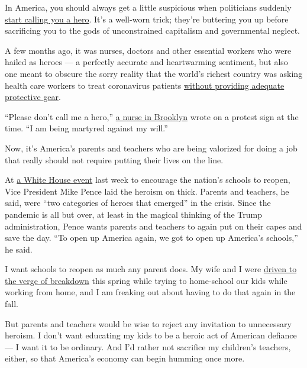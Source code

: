 In America, you should always get a little suspicious when politicians
suddenly
\href{https://slate.com/news-and-politics/2020/04/coronavirus-humans-vs-heroes.html}{start
calling you a hero}. It's a well-worn trick; they're buttering you up
before sacrificing you to the gods of unconstrained capitalism and
governmental neglect.

A few months ago, it was nurses, doctors and other essential workers who
were hailed as heroes --- a perfectly accurate and heartwarming
sentiment, but also one meant to obscure the sorry reality that the
world's richest country was asking health care workers to treat
coronavirus patients
\href{https://www.nytimes.com/2020/03/25/opinion/coronavirus-face-mask.html}{without
providing adequate protective gear}.

``Please don't call me a hero,''
\href{https://slate.com/technology/2020/04/nurse-hero-protest.html}{a
nurse in Brooklyn} wrote on a protest sign at the time. ``I am being
martyred against my will.''

Now, it's America's parents and teachers who are being valorized for
doing a job that really should not require putting their lives on the
line.

At
\href{https://www.whitehouse.gov/briefings-statements/remarks-president-trump-safely-reopening-americas-schools/}{a
White House event} last week to encourage the nation's schools to
reopen, Vice President Mike Pence laid the heroism on thick. Parents and
teachers, he said, were ``two categories of heroes that emerged'' in the
crisis. Since the pandemic is all but over, at least in the magical
thinking of the Trump administration, Pence wants parents and teachers
to again put on their capes and save the day. ``To open up America
again, we got to open up America's schools,'' he said.

I want schools to reopen as much any parent does. My wife and I were
\href{https://www.nytimes.com/2020/04/22/opinion/coronavirus-parenting-burnout.html}{driven
to the verge of breakdown} this spring while trying to home-school our
kids while working from home, and I am freaking out about having to do
that again in the fall.

But parents and teachers would be wise to reject any invitation to
unnecessary heroism. I don't want educating my kids to be a heroic act
of American defiance --- I want it to be ordinary. And I'd rather not
sacrifice my children's teachers, either, so that America's economy can
begin humming once more.

